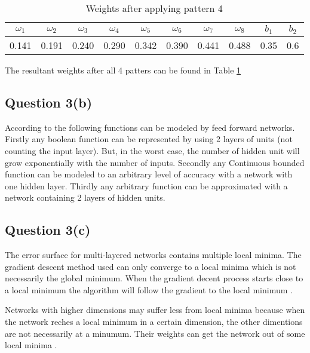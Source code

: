\documentclass[10pt,a4paper]{article}
\begin{document}
\begin{table}
\begin{tabular}{|c|c|c|c|c|c|c|c|c|c|}
\hline
$\omega_1$ & $\omega_2$ & $\omega_3$ & $\omega_4$ & $\omega_5$ & $\omega_6$ & $\omega_7$ & $\omega_8$ & $b_1$ & $b_2$\\
\hline
0.141 &0.191 &0.240 & 0.290 & 0.342 & 0.390 & 0.441 & 0.488 & 0.35 & 0.6 \\
\hline
\end{tabular}
\caption{Weights after applying pattern 4}\label{tablep5}
\end{table}


The resultant weights after all 4 patters can be found in Table \ref{tablep5}









\subsection{Question 3(b)}

According to \cite{Michell2009} the following functions can be modeled by feed forward networks. Firstly any boolean function can be represented by using 2 layers of units (not counting the input layer). But, in the worst case, the number of hidden unit will grow exponentially with the number of inputs. Secondly any Continuous bounded function can be modeled to an arbitrary level of accuracy with a network with one hidden layer. Thirdly any arbitrary function can be approximated with a network containing 2 layers of hidden units.
 
\subsection{Question 3(c)}

The error surface for multi-layered networks contains multiple local minima. The gradient descent method used can only converge to a local minima which is not necessarily the global minimum. When the gradient decent process starts close to a local minimum the algorithm will follow the gradient to the local minimum  \citep{Michell2009}.

Networks with higher dimensions may suffer less from local minima because when the network reches a local minimum in a certain dimension, the other dimentions are not necessarily at a minumum. Their weights can get the network out of some local minima  \citep{Michell2009}.
 
\end{document}
